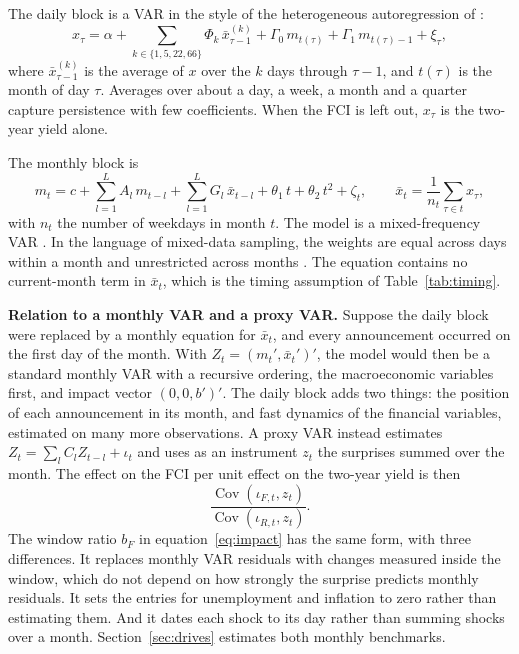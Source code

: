 \documentclass[11pt]{article}
\begin{document}
The daily block is a VAR in the style of the heterogeneous autoregression of \citet{corsi2009}:
\begin{equation}
x_\tau = \alpha + \sum_{k\in\{1,5,22,66\}} \Phi_k\, \bar x_{\tau-1}^{(k)} + \Gamma_0\, m_{t(\tau)} + \Gamma_1\, m_{t(\tau)-1} + \xi_\tau, \label{eq:daily}
\end{equation}
where $\bar x_{\tau-1}^{(k)}$ is the average of $x$ over the $k$ days through $\tau-1$, and $t(\tau)$ is the month of day $\tau$. Averages over about a day, a week, a month and a quarter capture persistence with few coefficients. When the FCI is left out, $x_\tau$ is the two-year yield alone.

The monthly block is
\begin{equation}
m_t = c + \sum_{l=1}^{L} A_l\, m_{t-l} + \sum_{l=1}^{L} G_l\, \bar x_{t-l} + \theta_1\, t + \theta_2\, t^2 + \zeta_t, \qquad \bar x_{t}=\frac{1}{n_t}\sum_{\tau\in t} x_\tau, \label{eq:monthly}
\end{equation}
with $n_t$ the number of weekdays in month $t$. The model is a mixed-frequency VAR \citep{ghysels2016}. In the language of mixed-data sampling, the weights are equal across days within a month and unrestricted across months \citep{ghysels2007,foroni2015}. The equation contains no current-month term in $\bar x_t$, which is the timing assumption of Table~\ref{tab:timing}.

\textbf{Relation to a monthly VAR and a proxy VAR.} Suppose the daily block were replaced by a monthly equation for $\bar x_t$, and every announcement occurred on the first day of the month. With $Z_t=(m_t',\bar x_t')'$, the model would then be a standard monthly VAR with a recursive ordering, the macroeconomic variables first, and impact vector $(0,0,b')'$. The daily block adds two things: the position of each announcement in its month, and fast dynamics of the financial variables, estimated on many more observations. A proxy VAR \citep{gertler2015,mertens2013,stock2018} instead estimates $Z_t=\sum_l C_l Z_{t-l}+\iota_t$ and uses as an instrument $z_t$ the surprises summed over the month. The effect on the FCI per unit effect on the two-year yield is then
\begin{equation}
\frac{\operatorname{Cov}(\iota_{F,t},z_t)}{\operatorname{Cov}(\iota_{R,t},z_t)}. \label{eq:proxy}
\end{equation}
The window ratio $b_F$ in equation~\eqref{eq:impact} has the same form, with three differences. It replaces monthly VAR residuals with changes measured inside the window, which do not depend on how strongly the surprise predicts monthly residuals. It sets the entries for unemployment and inflation to zero rather than estimating them. And it dates each shock to its day rather than summing shocks over a month. Section~\ref{sec:drives} estimates both monthly benchmarks.
\end{document}
